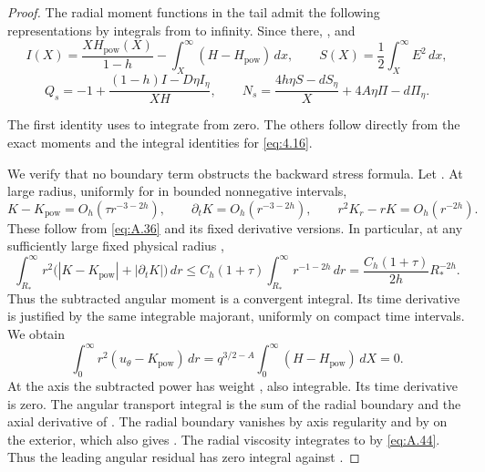 \begin{proof}
The radial moment functions in the tail admit the following representations by integrals from  to
infinity. Since  there, , and
\[
  I(X)=\frac{XH_{\mathrm{pow}}(X)}{1-h}-\int_X^\infty(H-H_{\mathrm{pow}})\,dx,
  \qquad
  S(X)=\frac12\int_X^\infty E^2\,dx,
\]
\[
  Q_s=-1+\frac{(1-h)I-D\eta I_\eta}{XH},
  \qquad
  N_s=\frac{4h\eta S-dS_\eta}{X}+4A\eta\Pi-d\Pi_\eta.
\]

%
The first identity uses  to integrate  from zero. The others
follow directly from the exact moments and the integral identities for  \eqref{eq:4.16}.

We verify that no boundary term obstructs the backward stress formula. Let
. At large radius, uniformly for  in bounded
nonnegative intervals,
\begin{equation}
  K-K_{\mathrm{pow}}=O_h(\tau r^{-3-2h}),\qquad
  \partial_tK=O_h(r^{-3-2h}),\qquad
  r^2K_r-rK=O_h(r^{-2h}).
  \tag{A.44}\label{eq:A.44}
\end{equation}
These follow from \eqref{eq:A.36} and its fixed derivative versions. In particular, at any sufficiently large fixed physical
radius ,
\[
  \int_{R_*}^\infty r^2\bigl(|K-K_{\mathrm{pow}}|+|\partial_tK|\bigr)\,dr
  \leq C_h(1+\tau)\int_{R_*}^\infty r^{-1-2h}\,dr
  =\frac{C_h(1+\tau)}{2h}R_*^{-2h}.
\]
Thus the subtracted angular moment is a convergent integral. Its time derivative is justified by the same integrable majorant,
uniformly on compact time intervals. We obtain
\begin{equation}
  \int_0^\infty r^2(u_\theta-K_{\mathrm{pow}})\,dr
  =q^{3/2-A}\int_0^\infty(H-H_{\mathrm{pow}})\,dX=0.
  \tag{A.45}\label{eq:A.45}
\end{equation}
At the axis the subtracted power has weight , also integrable. Its time derivative is zero. The
angular transport integral is the sum of the radial boundary
 and the axial derivative of
. The radial boundary vanishes by axis regularity and by
 on the exterior, which also gives . The radial viscosity integrates
to  by \eqref{eq:A.44}. Thus the leading angular residual
 has zero integral against .


\end{proof}
